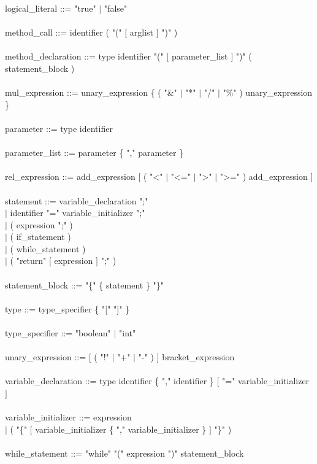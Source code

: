 \documentclass[10pt,a4paper,titlepage]{article}
\begin{document}
\begin{ttfamily}
logical\_literal ::= "true" $\mid$ "false" \\\\
method\_call ::= identifier ( "(" $[$ arglist $]$ ")" )\\\\
method\_declaration ::= type identifier "(" $[$ parameter\_list $]$ ")" ( statement\_block )\\\\
mul\_expression ::= unary\_expression \{ ( "\&" $\mid$ "*" $\mid$ "/" $\mid$ "\%" ) 
unary\_expression \} \\\\
parameter ::= type identifier \\\\
parameter\_list ::= parameter \{ "," parameter \} \\\\
rel\_expression ::= add\_expression $[$ ( "<" $\mid$ "<=" $\mid$ ">" $\mid$ ">=" ) add\_expression $]$ \\\\
statement ::= variable\_declaration ";"\\
\hspace*{3cm}$\mid$ identifier "=" variable\_initializer ";"\\
\hspace*{3cm}$\mid$ ( expression ";" ) \\
\hspace*{3cm}$\mid$ ( if\_statement ) \\
\hspace*{3cm}$\mid$ ( while\_statement ) \\
\hspace*{3cm}$\mid$ ( "return" $[$ expression $]$ ";" ) \\\\
statement\_block ::= "\{" \{ statement \} "\}" \\\\
type ::= type\_specifier \{ "[" "]" \} \\\\
type\_specifier ::= "boolean" $\mid$ "int" \\\\
unary\_expression ::= $[$ ( "!" $\mid$ "+" $\mid$ "-" ) $]$ bracket\_expression \\\\
variable\_declaration ::= type identifier \{ "," identifier \} $[$ "=" variable\_initializer $]$ \\\\
variable\_initializer ::= expression \\
\hspace*{4.8cm}$\mid$ ( "\{" $[$ variable\_initializer \{ "," variable\_initializer \} $]$ "\}" ) \\\\
while\_statement ::= "while" "(" expression ")" statement\_block \\
\end{ttfamily}
\end{document}
